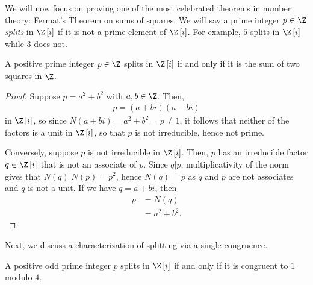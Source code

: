\documentclass[10pt]{mypackage}
\begin{document}
We will now focus on proving one of the most celebrated theorems in number theory: Fermat's Theorem on sums of squares. We will say a prime integer $p\in \Z$ \textit{splits} in $\Z\left[ i \right]$ if it is not a prime element of $\Z\left[ i \right]$. For example, $5$ splits in $\Z\left[ i \right]$ while $3$ does not.
\begin{lemma}
  A positive prime integer $p\in \Z$ splits in $\Z\left[ i \right]$ if and only if it is the sum of two squares in $\Z$.
\end{lemma}
\begin{proof}
  Suppose $p = a^2 + b^2$ with $a,b\in \Z$. Then,
  \begin{align*}
    p = \left( a+bi \right)\left( a-bi \right)
  \end{align*}
  in $\Z\left[ i \right]$, so since $N\left( a\pm bi \right) = a^2 + b^2 = p \neq 1$, it follows that neither of the factors is a unit in $\Z\left[ i \right]$, so that $p$ is not irreducible, hence not prime.

  Conversely, suppose $p$ is not irreducible in $\Z\left[ i \right]$. Then, $p$ has an irreducible factor $q\in \Z\left[ i \right]$ that is not an associate of $p$. Since $q | p$, multiplicativity of the norm gives that $N\left( q \right) | N\left( p \right) = p^2$, hence $N\left( q \right) = p $ as $q$ and $p$ are not associates and $q$ is not a unit. If we have $q = a + bi$, then
  \begin{align*}
    p &= N\left( q \right)\\
      &= a^2 + b^2.
  \end{align*}
\end{proof}
Next, we discuss a characterization of splitting via a single congruence. 
\begin{lemma}
  A positive odd prime integer $p$ splits in $\Z\left[ i \right]$ if and only if it is congruent to $1$ modulo $4$.
\end{lemma}
\end{document}
